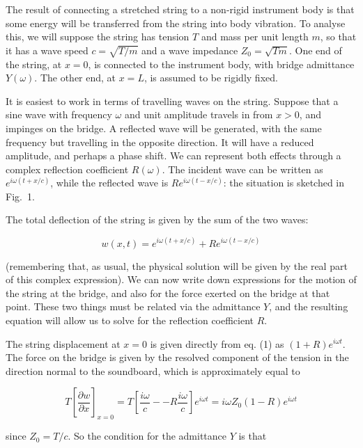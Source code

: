   The result of connecting a stretched string to a non-rigid instrument body is 
  that some energy will be transferred from the string into body vibration. To 
  analyse this, we will suppose the string has tension $T$ and mass per unit 
  length $m$, so that it has a wave speed $c=\sqrt{T/m}$ and a wave impedance 
  $Z_0=\sqrt{Tm}$. One end of the string, at $x=0$, is connected to the 
  instrument body, with bridge admittance $Y(\omega)$. The other end, at $x=L$, 
  is assumed to be rigidly fixed. 

  It is easiest to work in terms of travelling waves on the string. Suppose 
  that a sine wave with frequency $\omega$ and unit amplitude travels in from 
  $x>0$, and impinges on the bridge. A reflected wave will be generated, with 
  the same frequency but travelling in the opposite direction. It will have a 
  reduced amplitude, and perhaps a phase shift. We can represent both effects 
  through a complex reflection coefficient $R(\omega)$. The incident wave can 
  be written as $e^{i \omega(t+x/c)}$, while the reflected wave is $R e^{i 
  \omega (t-x/c)}$: the situation is sketched in Fig.\ 1. 


  The total deflection of the string is given by the sum of the two waves: 

  $$w(x,t)=e^{i \omega(t+x/c)}+R e^{i \omega (t-x/c)} \tag{1}$$ 

  (remembering that, as usual, the physical solution will be given by the real 
  part of this complex expression). We can now write down expressions for the 
  motion of the string at the bridge, and also for the force exerted on the 
  bridge at that point. These two things must be related via the admittance 
  $Y$, and the resulting equation will allow us to solve for the reflection 
  coefficient $R$. 

  The string displacement at $x=0$ is given directly from eq. (1) as $(1+R)e^{i 
  \omega t}$. The force on the bridge is given by the resolved component of the 
  tension in the direction normal to the soundboard, which is approximately 
  equal to 

  $$T \left[ \dfrac{\partial w}{\partial x} \right]_{x=0} = T \left[ \dfrac{i 
  \omega}{c} -- R \dfrac{i \omega}{c} \right] e^{i \omega t} = i \omega Z_0 
  (1-R) e^{i \omega t}\tag{2}$$ 

  since $Z_0=T/c$. So the condition for the admittance $Y$ is that 

